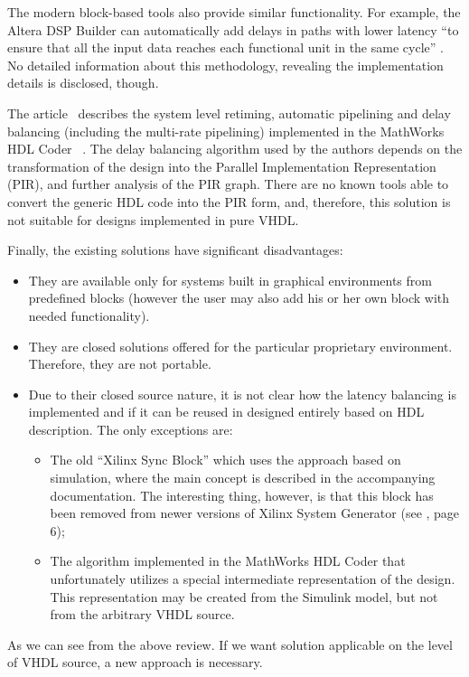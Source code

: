 \documentclass[preprint,11pt]{elsarticle}
\newcommand{\wzcite}[1]{ \cite{#1}}
\begin{document}
 The modern block-based tools also provide similar functionality.
 For example, the Altera DSP Builder can automatically add delays in paths
 with lower latency ``to ensure that all the input data reaches each functional
 unit in the same cycle''\wzcite{dsp-bld-adv-blkset, url-eetimes-fpga-tool}.
 No detailed information about this methodology, revealing the implementation details
 is disclosed, though.

The article~\wzcite{6861592} describes the system level retiming,
 automatic pipelining and delay balancing (including the multi-rate pipelining) implemented
 in the MathWorks HDL Coder~\wzcite{del-bal-hdl-coder}. The delay balancing algorithm 
 used by the authors depends on the transformation of the design
 into the Parallel Implementation Representation (PIR), and further analysis of the PIR graph.
 There are no known tools able to convert the generic HDL code into the PIR form, and, therefore,
 this solution is not suitable for designs implemented in pure VHDL.


 Finally, the existing solutions have significant disadvantages:
 \begin{itemize}
 \item They are available only for systems built in graphical environments from predefined blocks 
 (however the user may also add his or her own block with needed functionality).
 \item They are closed solutions offered for the particular proprietary environment. Therefore, they are not portable.
 \item Due to their closed source nature, it is not clear how the latency balancing is implemented and if it
 can be reused in designed entirely based on HDL description. The only exceptions are:
  \begin{itemize}
  \item The old ``Xilinx Sync Block'' which uses the approach based on simulation, where the main concept is described in the accompanying documentation. The interesting thing, however, is that this block has been removed from newer versions
 of Xilinx System Generator (see \wzcite{xlx-xsg-9.1}, page 6);
  \item The algorithm implemented in the MathWorks HDL Coder that unfortunately utilizes a special intermediate
  representation of the design. This representation may be created from the Simulink model, but not from the arbitrary VHDL source.
 \end{itemize}
 \end{itemize}
 As we can see from the above review. If we want solution applicable on the level of VHDL source,
 a new approach is necessary.
\end{document}
